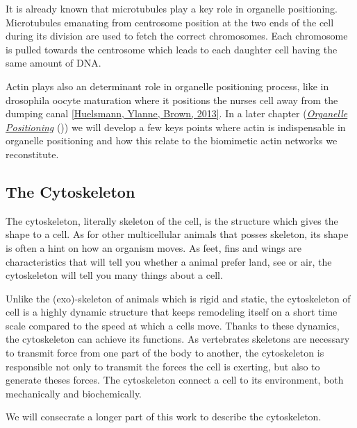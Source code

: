 \documentclass[A4paperpaper,11pt,english]{sphinxmanual}
\begin{document}
It is already known that microtubules play a key role in organelle positioning.
Microtubules emanating from centrosome position at the two ends of the cell
during its division are used to fetch the correct chromosomes. Each
chromosome is pulled towards the centrosome which leads to each daughter
cell having the same amount of DNA.

Actin plays also an determinant role in organelle positioning process,
like in drosophila oocyte maturation where it positions the nurses cell away
from the dumping canal {\hyperref[index-latex:huelsmann2013]{{[}Huelsmann, Ylanne, Brown,  2013{]}}}. In a later chapter ({\hyperref[index-latex:organelle-positioning]{\emph{Organelle
Positioning}}} ()) we will develop a few keys points where
actin is indispensable in organelle positioning and how this relate to the
biomimetic actin networks we reconstitute.


\subsection{The Cytoskeleton}
\label{index-latex:intro-cyto}\label{index-latex:the-cytoskeleton}
The cytoskeleton, literally skeleton of the cell, is the structure which gives
the shape to a cell.  As for other multicellular animals that posses
skeleton, its shape is often a hint on how an organism moves. As feet, fins and
wings are characteristics that will tell you whether a animal
prefer land, see or air, the cytoskeleton will tell you many
things about a cell.

Unlike the (exo)-skeleton of animals which is rigid and
static, the cytoskeleton of cell is a  highly dynamic structure that keeps
remodeling itself on a short time scale compared to the speed at which a cells
move. Thanks to these dynamics, the cytoskeleton can achieve its
functions.  As vertebrates skeletons are necessary to transmit force from one part
of the body to another, the cytoskeleton is responsible not only to
transmit the forces the cell is exerting, but also to generate theses forces.
The cytoskeleton connect a cell to its environment,
both mechanically and biochemically.

We will consecrate a longer part of this work to describe the cytoskeleton.
\end{document}
